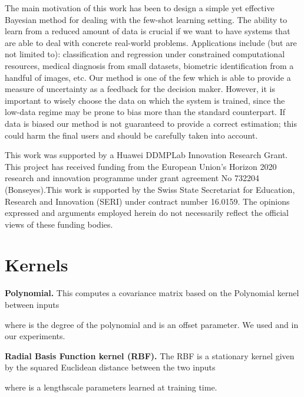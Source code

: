 \documentclass{article}
\begin{document}
The main motivation of this work has been to design a simple yet effective Bayesian method for dealing with the few-shot learning setting. The ability to learn from a reduced amount of data is crucial if we want to have systems that are able to deal with concrete real-world problems. Applications include (but are not limited to): classification and regression under constrained computational resources, medical diagnosis from small datasets, biometric identification from a handful of images, etc. 
Our method is one of the few which is able to provide a measure of uncertainty as a feedback for the decision maker. However, it is important to wisely choose the data on which the system is trained, since the low-data regime may be prone to bias more than the standard counterpart. If data is biased our method is not guaranteed to provide a correct estimation; this could harm the final users and should be carefully taken into account.

\begin{ack}
This work was supported by a Huawei DDMPLab Innovation Research Grant. This project has received funding from the European Union’s Horizon 2020 research and innovation programme under grant agreement No 732204 (Bonseyes).This work is supported by the Swiss State Secretariat for Education, Research and Innovation (SERI) under contract number 16.0159.  The opinions expressed and arguments employed herein do not necessarily reflect the official views of these funding bodies.
\end{ack}



\small


\FloatBarrier
\clearpage
\appendix 

\section{Kernels}
\label{sec:appendix_kernels}
\FloatBarrier

\textbf{Polynomial.} This computes a covariance matrix based on the Polynomial kernel between inputs

where  is the degree of the polynomial and  is an offset parameter. We used  and  in our experiments.

\textbf{Radial Basis Function kernel (RBF).} The RBF is a stationary kernel given by the squared Euclidean distance between the two inputs

where  is a lengthscale parameters learned at training time.
\end{document}
